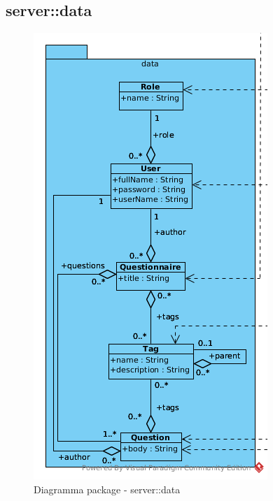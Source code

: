 \subsection{server::data}
\begin{center}
		\begin{figure}[H]
			\centering \includegraphics[scale=4, max width=\textwidth, max height=\myheight]{../img/diagrammiClassi/server/data.png}
			\caption{Diagramma package - server::data}
		\end{figure}
	\end{center}\hypertarget{server::data::Tag}{}
